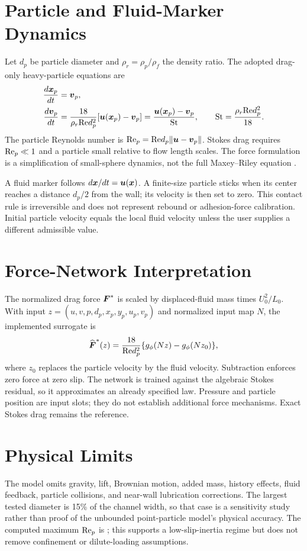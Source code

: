 \section{Particle and Fluid-Marker Dynamics}
Let $d_p$ be particle diameter and $\rho_r=\rho_p/\rho_f$ the density ratio.
The adopted drag-only heavy-particle equations are
\begin{align}
 \frac{d\boldsymbol{x}_p}{dt}&=\boldsymbol{v}_p,\label{eq:particle-position}\\
 \frac{d\boldsymbol{v}_p}{dt}&=\frac{18}{\rho_r\mathrm{Re} d_p^2}
 [\boldsymbol{u}(\boldsymbol{x}_p)-\boldsymbol{v}_p]
 =\frac{\boldsymbol{u}(\boldsymbol{x}_p)-\boldsymbol{v}_p}{\mathrm{St}},
 \qquad \mathrm{St}=\frac{\rho_r\mathrm{Re} d_p^2}{18}.
 \label{eq:particle-velocity}
\end{align}
The particle Reynolds number is
$\mathrm{Re}_p=\mathrm{Re} d_p\lVert\boldsymbol{u}-\boldsymbol{v}_p\rVert$.
Stokes drag requires $\mathrm{Re}_p\ll1$ and a particle small relative to flow
length scales. The force formulation is a simplification of small-sphere
dynamics, not the full Maxey--Riley equation \cite{maxey1983}.

A fluid marker follows $d\boldsymbol{x}/dt=\boldsymbol{u}(\boldsymbol{x})$. A finite-size
particle sticks when its center reaches a distance $d_p/2$ from the wall;
its velocity is then set to zero. This contact rule is irreversible and
does not represent rebound or adhesion-force calibration. Initial particle
velocity equals the local fluid velocity unless the user supplies a
different admissible value.

\section{Force-Network Interpretation}
The normalized drag force $\boldsymbol{F}^{*}$ is scaled by displaced-fluid mass
times $U_0^2/L_0$. With input
$z=(u,v,p,d_p,x_p,y_p,u_p,v_p)$ and normalized input map $N$, the implemented
surrogate is
\begin{equation}
 \widehat{\boldsymbol{F}}^{*}(z)=\frac{18}{\mathrm{Re} d_p^2}
 \{g_\phi(Nz)-g_\phi(Nz_0)\},
 \label{eq:force-network}
\end{equation}
where $z_0$ replaces the particle velocity by the fluid velocity. Subtraction
enforces zero force at zero slip. The network is trained against the
algebraic Stokes residual, so it approximates an already specified law.
Pressure and particle position are input slots; they do not establish
additional force mechanisms. Exact Stokes drag remains the reference.

\section{Physical Limits}
The model omits gravity, lift, Brownian motion, added mass, history effects,
fluid feedback, particle collisions, and near-wall lubrication corrections.
The largest tested diameter is 15\% of the channel width, so that case is a
sensitivity study rather than proof of the unbounded point-particle model's
physical accuracy. The computed maximum $\mathrm{Re}_p$ is
\MaximumParticleRe; this supports a low-slip-inertia regime but does not
remove confinement or dilute-loading assumptions.
